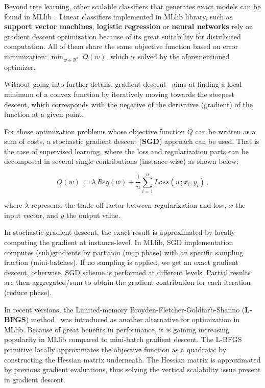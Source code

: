 \documentclass[3p,review]{elsarticle}
\begin{document}
Beyond tree learning, other scalable classifiers that generates exact models can be found in MLlib~\cite{mllibguide}. Linear classifiers implemented in MLlib library, such as \textbf{support vector machines}, \textbf{logistic regression} or \textbf{neural networks} rely on gradient descent optimization because of its great suitability for distributed computation. All of them share the same objective function based on error minimization: $\min_{w \in \mathbb{R}^d} \; Q(w)$, which is solved by the aforementioned optimizer.

Without going into further details, gradient descent~\cite{hastie11} aims at finding a local minimum of a convex function by iteratively moving towards the steepest descent, which corresponds with the negative of the derivative (gradient) of the function at a given point. 

For those optimization problems whose objective function $Q$ can be written as a sum of costs, a stochastic gradient descent (\textbf{SGD}) approach can be used. That is the case of supervised learning, where the loss and regularization parts can be decomposed in several single contributions (instance-wise) as shown below:

\begin{equation}
    Q(w) := 
    \lambda\, Reg(w) +
    \frac1n \sum_{i=1}^n Loss(w;x_i,y_i) 
    \label{eq:regPrimal}
    \ .
\end{equation}

\indent where $\lambda$ represents the trade-off factor between regularization and loss, $x$ the input vector, and $y$ the output value.

In stochastic gradient descent, the exact result is approximated by locally computing the gradient at instance-level. In MLlib, SGD implementation computes (sub)gradients by partition (map phase) with an specific sampling fraction (mini-batches). If no sampling is applied, we get an exact gradient descent, otherwise, SGD scheme is performed at different levels. Partial results are then aggregated/sum to obtain the gradient contribution for each iteration (reduce phase).  

In recent versions, the Limited-memory Broyden-Fletcher-Goldfarb-Shanno (\textbf{L-BFGS}) method~\cite{liu89} was introduced as another alternative for optimization in MLlib. Because of great benefits in performance, it is gaining increasing popularity in MLlib compared to mini-batch gradient descent. The L-BFGS primitive locally approximates the objective function as a quadratic by constructing the Hessian matrix underneath. The Hessian matrix is approximated by previous gradient evaluations, thus solving the vertical scalability issue present in gradient descent.
\end{document}
